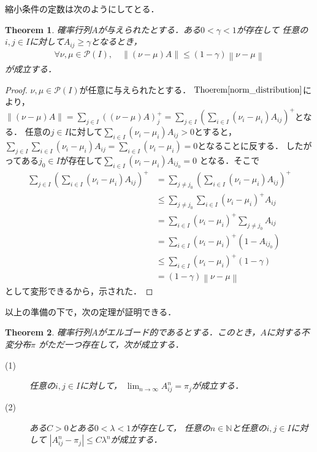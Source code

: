 \documentclass[dvipdfmx,autodetect-engine]{jsarticle}
\newtheorem{theorem}{Theorem}[section]
\theoremstyle{remark}
\theoremstyle{definition}
\newcommand{\N}{\mathbb{N}}
\newcommand{\abs}[1]{\left\lvert#1\right\rvert}%
\newcommand{\norm}[1]{\left\lVert#1\right\rVert}%
\begin{document}
縮小条件の定数は次のようにしてとる．


\begin{theorem}\label{contraction_ergodic}
    確率行列$A$が与えられたとする．ある$0 <\gamma<1$が存在して
    任意の$i,j \in I$に対して$A_{ij} \geq \gamma$となるとき，
    \begin{align}
        \forall \nu,\mu \in \mathcal{P}(I),\quad 
        \norm{(\nu -\mu)A} \leq (1-\gamma)\norm{\nu-\mu}
    \end{align}
    が成立する．
\end{theorem}


\begin{proof}
    $\nu,\mu \in \mathcal{P}(I)$が任意に与えられたとする．
    $\mathrm{Thoerem}\ref{norm_distribution}$により，
    $\norm{(\nu -\mu)A} = \sum_{j \in I} \left((\nu - \mu)A\right)_{j}^{+}
    = \sum_{j \in I} \left(\sum_{i \in I} (\nu_{i} - \mu_{i})A_{ij}\right)^{+}$となる．
    任意の$j \in I$に対して$\sum_{i \in I}(\nu_{i}-\mu_{i})A_{ij}>0$とすると，
    $\sum_{j \in I}\sum_{i \in I} (\nu_{i}-\mu_{i})A_{ij} = 
    \sum_{i \in I} (\nu_{i} - \mu_{i}) = 0$となることに反する．
    したがってある$j_0 \in I$が存在して$\sum_{i \in I}(\nu_{i}-\mu_{i})A_{ij_{0}}=0$
    となる．そこで
    \begin{align}
        \sum_{j \in I} \left(\sum_{i \in I} (\nu_{i} - \mu_{i})A_{ij}\right)^{+} 
        &=\sum_{j \neq j_0} \left(\sum_{i \in I} (\nu_{i} - \mu_{i})A_{ij}\right)^{+} \\
        &\leq \sum_{j \neq j_0} \sum_{i \in I} (\nu_{i} - \mu_{i})^{+} A_{ij} \\
        &= \sum_{i \in I} (\nu_{i} - \mu_{i})^{+} \sum_{j \neq j_0} A_{ij} \\
        &= \sum_{i \in I} (\nu_{i} - \mu_{i})^{+} (1-A_{ij_{0}})\\
        &\leq \sum_{i \in I} (\nu_{i} - \mu_{i})^{+} (1-\gamma)\\
        &= (1-\gamma)\norm{\nu-\mu}
    \end{align}
    として変形できるから，示された．
\end{proof}


以上の準備の下で，次の定理が証明できる．


\begin{theorem}\label{ergodic_converge}
    確率行列$A$がエルゴード的であるとする．このとき，$A$に対する不変分布$\pi$
    がただ一つ存在して，次が成立する．
    \begin{description}
        \item[(1)] 任意の$i,j \in I$に対して，
        $\lim_{n \to \infty} A_{ij}^n = \pi_j$が成立する．
        \item[(2)] ある$C>0$とある$0<\lambda < 1$が存在して，
        任意の$n \in \N$と任意の$i,j \in I$に対して
        $\abs{A_{ij}^n - \pi_{j}} \leq C\lambda^{n}$が成立する．
    \end{description}
\end{theorem}
\end{document}
